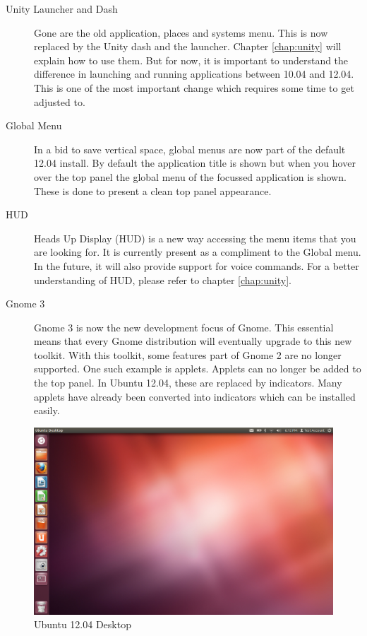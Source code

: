 \begin{description}
	\item [Unity Launcher and Dash] Gone are the old application, places and systems menu. This is now replaced by the Unity dash and the launcher. Chapter \ref{chap:unity} will explain how to use them. But for now, it is important to understand the difference in launching and running applications between 10.04 and 12.04. This is one of the most important change which requires some time to get adjusted to.
	
	\item [Global Menu] In a bid to save vertical space, global menus are now part of the default 12.04 install. By default the application title is shown but when you hover over the top panel the global menu of the focussed application is shown. These is done to present a clean top panel appearance. 
		
	\item [HUD] Heads Up Display (HUD) is a new way accessing the menu items that you are looking for. It is currently present as a compliment to the Global menu. In the future, it will also provide support for voice commands. For a better understanding of HUD, please refer to chapter \ref{chap:unity}.

	\item [Gnome 3] Gnome 3 is now the new development focus of Gnome. This essential means that every Gnome distribution will eventually upgrade to this new toolkit. With this toolkit, some features part of Gnome 2 are no longer supported. One such example is applets. Applets can no longer be added to the top panel. In Ubuntu 12.04, these are replaced by indicators. Many applets have already been converted into indicators which can be installed easily.	
\end{description}

\begin{figure}[h!]	
	\centering
	\includegraphics[width=400pt]{./images/ubuntu12-04.png}
	\caption{Ubuntu 12.04 Desktop}	
	\label{fig:ubuntu12.04}		
\end{figure}